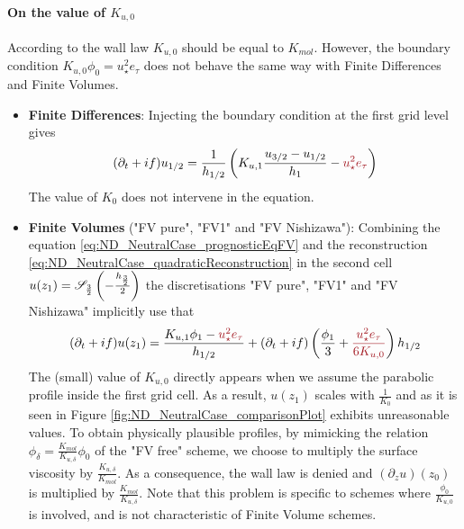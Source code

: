\paragraph{On the value of $K_{u,0}$}
\label{sec:ND_StratifiedCase_viscosity0_FVpure}
According to the wall law $K_{u,0}$ should be equal to $K_{mol}$.
However, the boundary condition $K_{u,0} \phi_0 = u_\star^2 e_\tau$
does not behave the same way with Finite Differences and Finite
Volumes.
\begin{itemize}
	\item \textbf{Finite Differences}:
Injecting the boundary condition at the first grid level gives
		\begin{equation}
			(\partial_t+if) u_{1/2} = \frac{1}{h_{1/2}}
			\left(K_{u,1}\frac{u_{3/2} - u_{1/2}}{h_1}
			 - \emphase{u_\star^2 e_\tau} \right)
		\end{equation}
The value of $K_0$ does not intervene in the equation.
\item \textbf{Finite Volumes} ("FV pure", "FV1" and "FV Nishizawa"):
Combining the equation \eqref{eq:ND_NeutralCase_prognosticEqFV}
and the reconstruction
\eqref{eq:ND_NeutralCase_quadraticReconstruction} in the second cell
$u(z_1) = {\cal S}_{\frac{3}{2}}\left(-\frac{h_\frac{3}{2}}{2}\right)$
the discretisations "FV pure", "FV1" and "FV Nishizawa"
implicitly use that
\begin{equation}
	(\partial_t+if) u(z_1) =
	\frac{K_{u,1} \phi_1 - \emphase{u_\star^2 e_\tau}}{h_{1/2}}
	+ (\partial_t+if)\left(\frac{\phi_1}{3}
	+ \emphase{\frac{u_\star^2 e_\tau}{6 K_{u,0}}}\right)h_{1/2}
\end{equation}
The (small) value of $K_{u,0}$ directly appears when we assume the
parabolic profile inside the first grid cell.
As a result, $u(z_1)$ scales with $\frac{1}{K_0}$ and
as it is seen in Figure \ref{fig:ND_NeutralCase_comparisonPlot}
exhibits unreasonable values.
To obtain physically plausible profiles,
by mimicking the relation
$\phi_{\delta} = \frac{K_{mol}}{K_{u,\delta}}\phi_0$ of the
"FV free" scheme, we choose to multiply the surface
viscosity by $\frac{K_{u,\delta}}{K_{mol}}$.
As a consequence, the wall law is denied and
$(\partial_z u)(z_0)$ is multiplied
by $\frac{K_{mol}}{K_{u,\delta}}$.
Note that this problem is specific to schemes where
$\frac{\phi_0}{K_{u,0}}$ is involved, and
is not characteristic of Finite Volume schemes.
\end{itemize}

